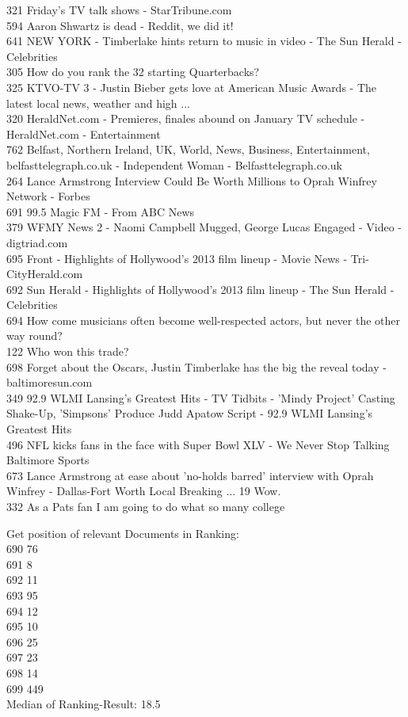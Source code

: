 \documentclass[11pt]{article}
\begin{document}
321 Friday's TV talk shows - StarTribune.com\\
594 Aaron Shwartz is dead - Reddit, we did it!\\
641 NEW YORK - Timberlake hints return to music in video - The Sun
Herald - Celebrities\\
305 How do you rank the 32 starting Quarterbacks?\\
325 KTVO-TV 3 - Justin Bieber gets love at American Music Awards - The
latest local news, weather and high ...\\
320 HeraldNet.com - Premieres, finales abound on January TV schedule -
HeraldNet.com - Entertainment\\
762 Belfast, Northern Ireland, UK, World, News, Business, Entertainment,
belfasttelegraph.co.uk - Independent Woman - Belfasttelegraph.co.uk\\
264 Lance Armstrong Interview Could Be Worth Millions to Oprah Winfrey
Network - Forbes\\
691 99.5 Magic FM - From ABC News\\
379 WFMY News 2 - Naomi Campbell Mugged, George Lucas Engaged - Video -
digtriad.com\\
695 Front - Highlights of Hollywood's 2013 film lineup - Movie News -
Tri-CityHerald.com\\
692 Sun Herald - Highlights of Hollywood's 2013 film lineup - The Sun
Herald - Celebrities\\
694 How come musicians often become well-respected actors, but never the
other way round?\\
122 Who won this trade?\\
698 Forget about the Oscars, Justin Timberlake has the big the reveal
today - baltimoresun.com\\
349 92.9 WLMI Lansing's Greatest Hits - TV Tidbits - 'Mindy Project'
Casting Shake-Up, 'Simpsons' Produce Judd Apatow Script - 92.9 WLMI
Lansing's Greatest Hits\\
496 NFL kicks fans in the face with Super Bowl XLV - We Never Stop
Talking Baltimore Sports\\
673 Lance Armstrong at ease about 'no-holds barred' interview with Oprah
Winfrey - Dallas-Fort Worth Local Breaking ... 19 Wow.\\
332 As a Pats fan I am going to do what so many college

    Get position of relevant Documents in Ranking:\\
690 76\\
691 8\\
692 11\\
693 95\\
694 12\\
695 10\\
696 25\\
697 23\\
698 14\\
699 449\\
Median of Ranking-Result: 18.5
\end{document}
